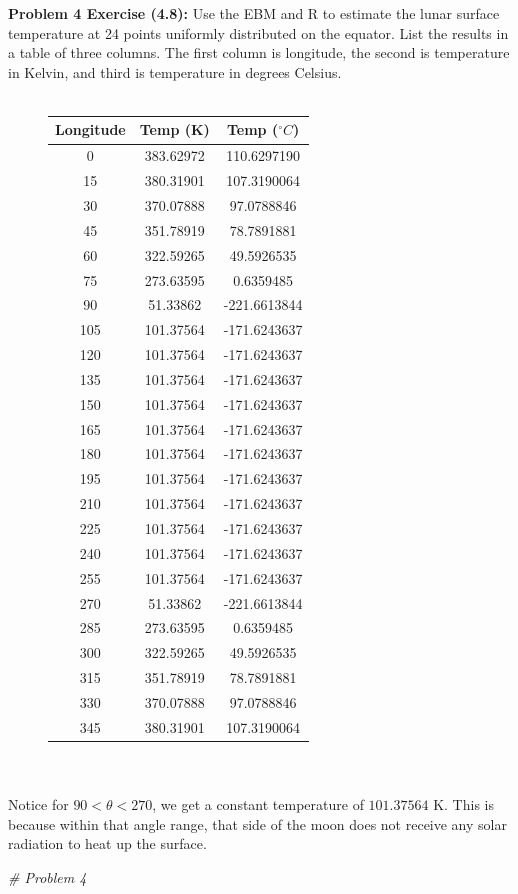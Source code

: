 \documentclass[11pt]{article}
\newenvironment{problem}[1]{\textbf{Problem #1: }}{\newpage}
\newenvironment{Shaded}{\begin{snugshade}}{\end{snugshade}}
\newcommand{\CommentTok}[1]{\textcolor[rgb]{0.56,0.35,0.01}{\textit{#1}}}
\begin{document}
	\begin{problem}{4 Exercise (4.8)}
		Use the EBM and R to estimate the lunar surface temperature at 24 points uniformly
		distributed on the equator. List the results in a table of three columns. The first column is
		longitude, the second is temperature in Kelvin, and third is temperature in degrees Celsius.
		\\ \\
		\begin{figure}[h!]
			\centering
			\begin{tabular}{|c|c|c|}
				\hline
				Longitude & Temp (K) & Temp ($^\circ C$) \\
				\hline
 				 0 & 383.62972 & 110.6297190 \\
			    15 & 380.31901 &  107.3190064 \\
			    30 & 370.07888 &   97.0788846 \\
			    45 & 351.78919 &   78.7891881 \\
			    60 & 322.59265 &  49.5926535 \\
			    75 & 273.63595 &  0.6359485 \\
			    90 &  51.33862 & -221.6613844 \\
			   105 & 101.37564 & -171.6243637 \\
			   120 & 101.37564 & -171.6243637 \\
			   135 & 101.37564 & -171.6243637 \\
			   150 & 101.37564 & -171.6243637 \\
			   165 & 101.37564 & -171.6243637 \\
			   180 & 101.37564 & -171.6243637 \\
			   195 & 101.37564 & -171.6243637 \\
			   210 & 101.37564 & -171.6243637 \\
			   225 & 101.37564 & -171.6243637 \\
			   240 & 101.37564 & -171.6243637 \\
			   255 & 101.37564 & -171.6243637 \\
			   270 &  51.33862 & -221.6613844 \\
			   285 & 273.63595 &    0.6359485 \\ 
			   300 & 322.59265 &   49.5926535 \\
			   315 & 351.78919 &   78.7891881 \\
			   330 & 370.07888 &   97.0788846 \\ 
			   345 & 380.31901 &  107.3190064 \\
			   \hline
			\end{tabular}
		\end{figure}
		\\ \\
		Notice for $90 < \theta < 270$, we get a constant temperature of $101.37564$ K.  This is because within that angle range, that side of the moon does not receive any solar radiation to heat up the surface.
		\newpage
\begin{Shaded}
\begin{Highlighting}[]
\CommentTok{# Problem 4}


\end{Highlighting}
\end{Shaded}
\end{problem}
\end{document}
